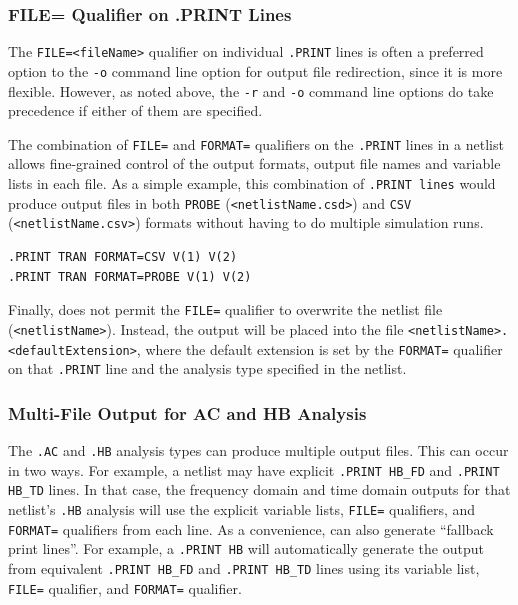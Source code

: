 \subsubsection{FILE= Qualifier on .PRINT Lines}
The \texttt{FILE=<fileName>} qualifier on individual \texttt{.PRINT} lines is
often a preferred option to the \verb+-o+ command line option for output file 
redirection, since it is more flexible.  However, as noted above, the \verb+-r+
 and \verb+-o+ command line options do take precedence if either of them are 
specified.

The combination of \texttt{FILE=} and \texttt{FORMAT=} qualifiers on the 
\texttt{.PRINT} lines in a netlist allows fine-grained control of the 
output formats, output file names and variable lists in each file.  As a 
simple example, this combination of \texttt{.PRINT lines} would produce output
files in both \texttt{PROBE} (\verb+<netlistName.csd>+) and \texttt{CSV}
(\verb+<netlistName.csv>+) formats without having to do multiple simulation runs.

\begin{verbatim}
.PRINT TRAN FORMAT=CSV V(1) V(2)
.PRINT TRAN FORMAT=PROBE V(1) V(2) 
\end{verbatim}

Finally, \Xyce{} does not permit the \texttt{FILE=} qualifier to overwrite the 
netlist file (\verb+<netlistName>+).  Instead, the output will be placed into 
the file \verb+<netlistName>.<defaultExtension>+, where the default extension
is set by  the \texttt{FORMAT=} qualifier on that \texttt{.PRINT} line and the 
analysis type specified in the netlist.

\subsubsection{Multi-File Output for AC and HB Analysis}
The {\tt .AC} and {\tt .HB} analysis types can produce multiple output files.
This can occur in two ways.  For example, a netlist may have explicit
\texttt{.PRINT HB\_FD} and \texttt{.PRINT HB\_TD} lines.  In that case, the
frequency domain and time domain outputs for that netlist's {\tt .HB} analysis 
will use the explicit variable lists, \texttt{FILE=} qualifiers, and \texttt{FORMAT=} 
qualifiers from each line.  As a convenience, \Xyce{} can also generate
``fallback print lines''.  For example, a \texttt{.PRINT HB} will 
automatically generate the output from equivalent \texttt{.PRINT HB\_FD} 
and \texttt{.PRINT HB\_TD} lines using its variable list, \texttt{FILE=} qualifier, 
and \texttt{FORMAT=} qualifier.  


